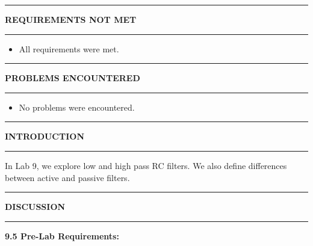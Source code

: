 \documentclass{article}
\begin{document}

\begin{center}
    \hrule
    \vspace{0.2cm}
    \textbf{\large REQUIREMENTS NOT MET}
    \vspace{0.2cm}
    \hrule
\end{center}
\begin{itemize}
    \item All requirements were met.
\end{itemize}

\begin{center}
    \hrule
    \vspace{0.2cm}
    \textbf{\large PROBLEMS ENCOUNTERED}
    \vspace{0.2cm}
    \hrule
\end{center}
\begin{itemize}
    \item No problems were encountered.
\end{itemize}

\begin{center}
    \hrule
    \vspace{0.2cm}
    \textbf{\large INTRODUCTION}
    \vspace{0.2cm}
    \hrule
\end{center}

In Lab 9, we explore low and high pass RC filters.
We also define differences between active and passive filters.

\begin{center}
    \hrule
    \vspace{0.2cm}
    \textbf{\large DISCUSSION}
    \vspace{0.2cm}
    \hrule
\end{center}

\textbf{\large 9.5 Pre-Lab Requirements:}
\end{document}
